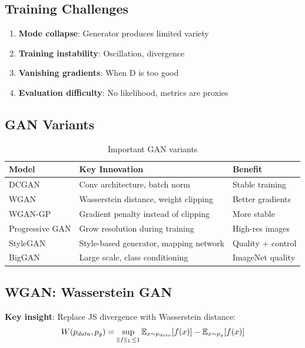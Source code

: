 \subsection{Training Challenges}

\begin{enumerate}
    \item \textbf{Mode collapse}: Generator produces limited variety
    \item \textbf{Training instability}: Oscillation, divergence
    \item \textbf{Vanishing gradients}: When D is too good
    \item \textbf{Evaluation difficulty}: No likelihood, metrics are proxies
\end{enumerate}

\subsection{GAN Variants}

\begin{table}[H]
\centering
\caption{Important GAN variants}
\begin{tabularx}{\textwidth}{lXX}
\toprule
\textbf{Model} & \textbf{Key Innovation} & \textbf{Benefit} \\
\midrule
DCGAN & Conv architecture, batch norm & Stable training \\
WGAN & Wasserstein distance, weight clipping & Better gradients \\
WGAN-GP & Gradient penalty instead of clipping & More stable \\
Progressive GAN & Grow resolution during training & High-res images \\
StyleGAN & Style-based generator, mapping network & Quality + control \\
BigGAN & Large scale, class conditioning & ImageNet quality \\
\bottomrule
\end{tabularx}
\end{table}

\subsection{WGAN: Wasserstein GAN}

\textbf{Key insight}: Replace JS divergence with Wasserstein distance:
\begin{equation}
W(p_{data}, p_g) = \sup_{\|f\|_L \leq 1} \operatorname{\mathbb{E}}_{x \sim p_{data}}[f(x)] - \operatorname{\mathbb{E}}_{x \sim p_g}[f(x)]
\end{equation}


